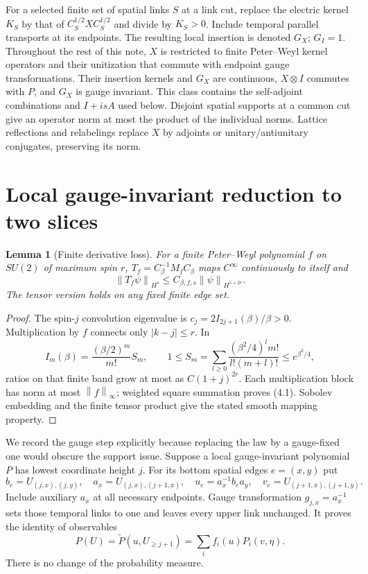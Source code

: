 \documentclass[11pt]{article}
\newtheorem{lemma}[theorem]{Lemma}
\theoremstyle{remark}
\newcommand{\norm}[1]{\left\|#1\right\|}
\begin{document}
For a selected finite set of spatial links $S$ at a link cut, replace
the electric kernel $K_S$ by that of $C_S^{1/2}XC_S^{1/2}$ and divide
by $K_S>0$. Include temporal parallel transports at its endpoints.
The resulting local insertion is denoted $G_X$; $G_I=1$.
Throughout the rest of this note, $X$ is restricted to finite
Peter--Weyl kernel operators and their unitization that commute with
endpoint gauge transformations. Their insertion kernels and $G_X$
are continuous, $X\otimes I$ commutes with $P$, and $G_X$ is
gauge invariant. This class contains the self-adjoint combinations and
$I+isA$ used below. Disjoint spatial supports at a common cut give an
operator norm at most the product of the individual norms.
Lattice reflections and relabelings replace $X$ by adjoints or
unitary/antiunitary conjugates, preserving its norm.

\section{Local gauge-invariant reduction to two slices}

\begin{lemma}[Finite derivative loss]\label{lem:convolution}
For a finite Peter--Weyl polynomial $f$ on $SU(2)$ of maximum spin
$r$, $T_f=C_\beta^{-1}M_fC_\beta$ maps $C^\infty$ continuously to
itself and
\[
 \norm{T_f\psi}_{H^s}\le C_{\beta,f,s}\norm\psi_{H^{s+2r}}.
 \tag{4.1}
\]
The tensor version holds on any fixed finite edge set.
\end{lemma}
\begin{proof}
The spin-$j$ convolution eigenvalue is
$c_j=2I_{2j+1}(\beta)/\beta>0$. Multiplication by $f$ connects
only $|k-j|\le r$. In
\[
 I_m(\beta)=\frac{(\beta/2)^m}{m!}S_m,\qquad
 1\le S_m=\sum_{l\ge0}
 \frac{(\beta^2/4)^l m!}{l!(m+l)!}\le e^{\beta^2/4},
\]
ratios on that finite band grow at most as $C(1+j)^{2r}$.
Each multiplication block has norm at most $\norm f_\infty$;
weighted square summation proves (4.1). Sobolev embedding and the
finite tensor product give the stated smooth mapping property.
\end{proof}

We record the gauge step explicitly because replacing the law by a
gauge-fixed one would obscure the support issue. Suppose a local
gauge-invariant polynomial $P$ has lowest coordinate height $j$.
For its bottom spatial edges $e=(x,y)$ put
\[
 b_e=U_{(j,x),(j,y)},\quad a_x=U_{(j,x),(j+1,x)},\quad
 u_e=a_x^{-1}b_ea_y,\quad v_e=U_{(j+1,x),(j+1,y)}.
\]
Include auxiliary $a_x$ at all necessary endpoints. Gauge transformation
$g_{j,x}=a_x^{-1}$ sets those temporal links to one and leaves every
upper link unchanged. It proves the identity of observables
\[
 P(U)=\widetilde P(u,U_{\ge j+1})
      =\sum_i f_i(u)P_i(v,\eta).
 \tag{4.2}
\]
There is no change of the probability measure.
\end{document}
